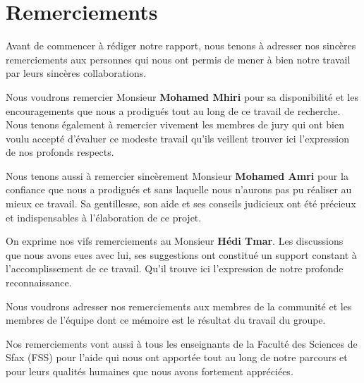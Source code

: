 \section*{Remerciements}

\vspace{0.9in}
\begin{center}

    Avant de commencer à rédiger notre rapport, nous tenons à adresser nos
    sincères remerciements aux personnes qui nous ont permis de mener à bien
    notre travail par leurs sincères collaborations.

    Nous voudrons remercier Monsieur \textbf{Mohamed Mhiri} pour sa
    disponibilité et les encouragements que nous a prodigués tout au long de ce
    travail de recherche. Nous tenons également à remercier vivement les membres
    de jury qui ont bien voulu accepté d'évaluer ce modeste travail qu'ils
    veillent trouver ici l'expression de nos profonds respects.

    Nous tenons aussi à remercier sincèrement Monsieur \textbf{Mohamed Amri}
    pour la confiance que nous a prodigués et sans laquelle nous n’aurons pas
    pu réaliser au mieux ce travail. Sa gentillesse, son aide et ses conseils
    judicieux ont été précieux et indispensables à l'élaboration de ce projet.

    On exprime nos vifs remerciements au Monsieur \textbf{Hédi Tmar}. Les
    discussions que nous avons eues avec lui, ses suggestions ont constitué un
    support constant à l'accomplissement de ce travail. Qu'il trouve ici
    l'expression de notre profonde reconnaissance.

    Nous voudrons adresser nos remerciements aux membres de la communité
    \textbf{} et les membres de l'équipe
    \textbf{} dont ce mémoire est le résultat du
    travail du groupe.

    Nos remerciements vont aussi à tous les enseignants de la Faculté des
    Sciences de Sfax (FSS) pour l'aide qui nous ont apportée tout au long de
    notre parcours et pour leurs qualités humaines que nous avons fortement
    appréciées.
\end{center}
